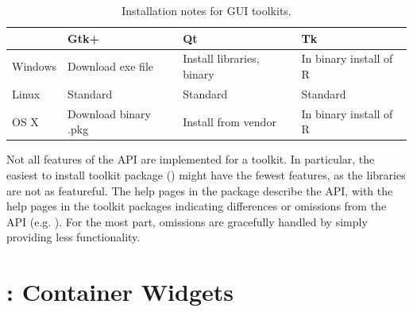 \begin{table}
\centering
\label{tab:gWidgets-installation}
\caption{Installation notes for GUI toolkits.}
\begin{tabular}{@{}lp{}p{}p{}@{}}
\toprule

&Gtk+&Qt&Tk\\
\midrule
Windows&Download exe file&Install libraries, binary&In binary install of R\\Linux&Standard&Standard&Standard\\OS X&Download binary .pkg&Install from vendor&In binary install of R
\\ \bottomrule
\end{tabular}
\end{table}
Not all features of the  API are implemented for a
toolkit. In particular, the easiest to install toolkit package
() might have the fewest features, as the 
libraries are not as featureful.  The help pages in the 
package describe the API, with the help pages in the toolkit packages
indicating differences or omissions from the API
(e.g. ). For the most part, omissions are
gracefully handled by simply providing less functionality.







\chapter{: Container Widgets}
\label{sec:gWidgets-Containers}

